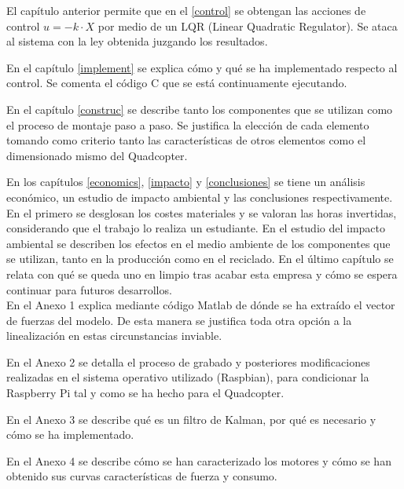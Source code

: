 \documentclass[twoside,11pt]{report}
\begin{document}
El capítulo anterior permite que en el \ref{control} se obtengan las acciones de control $u=-k \cdot X$ por medio de un LQR (Linear Quadratic Regulator). Se ataca al sistema con la ley obtenida juzgando los resultados.

En el capítulo \ref{implement} se explica cómo y qué se ha implementado respecto al control. Se comenta el código C que se está continuamente ejecutando.

En el capítulo \ref{construc} se describe tanto los componentes que se utilizan como el proceso de montaje paso a paso. Se justifica la elección de cada elemento tomando como criterio tanto las características de otros elementos como el dimensionado mismo del Quadcopter. 

En los capítulos \ref{economics}, \ref{impacto} y \ref{conclusiones} se tiene un análisis económico, un estudio de impacto ambiental y las conclusiones respectivamente. En el primero se desglosan los costes materiales y se valoran las horas invertidas, considerando que el trabajo lo realiza un estudiante. En el estudio del impacto ambiental se describen los efectos en el medio ambiente de los componentes que se utilizan, tanto en la producción como en el reciclado. En el último capítulo se relata con qué se queda uno en limpio tras acabar esta empresa y cómo se espera continuar para futuros desarrollos.\\

En el Anexo 1 explica mediante código Matlab de dónde se ha extraído el vector de fuerzas del modelo. De esta manera se justifica toda otra opción a la linealización en estas circunstancias inviable.

En el Anexo 2 se detalla el proceso de grabado y posteriores modificaciones realizadas en el sistema operativo utilizado (Raspbian), para condicionar la Raspberry Pi tal y como se ha hecho para el Quadcopter.
 
En el Anexo 3 se describe qué es un filtro de Kalman, por qué es necesario y cómo se ha implementado. 

En el Anexo 4 se describe cómo se han caracterizado los motores y cómo se han obtenido sus curvas características de fuerza y consumo. 

\newpage
\begin{center}

\end{center}
\thispagestyle{empty}
\newpage

\setcounter{page}{1}
\tableofcontents
{}
\fancyfoot[C]{}
\newpage
\fancyhead[LE,RO]{\thepage}
\setcounter{page}{4}
\listoffigures
\newpage
\end{document}
